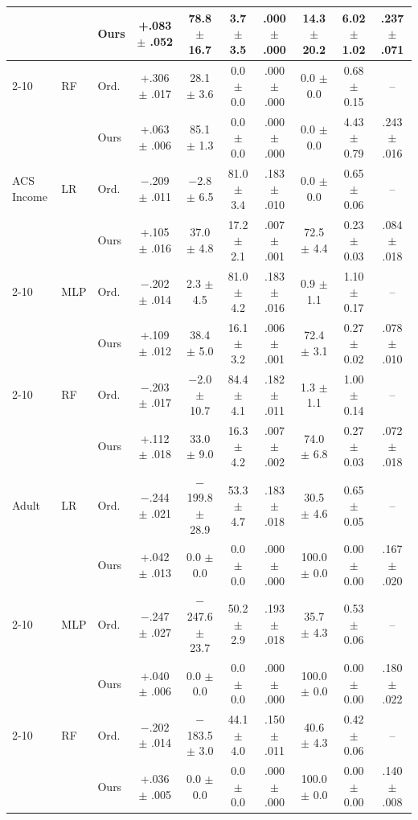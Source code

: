 \begin{table}[t]
\begin{tabular}{lll ccccccc}
 &  & Ours & +.083 $\pm$ .052 & 78.8 $\pm$ 16.7 & 3.7 $\pm$ 3.5 & .000 $\pm$ .000 & 14.3 $\pm$ 20.2 & 6.02 $\pm$ 1.02 & .237 $\pm$ .071 \\
\cline{2-10}
 & RF & Ord. & +.306 $\pm$ .017 & 28.1 $\pm$ 3.6 & 0.0 $\pm$ 0.0 & .000 $\pm$ .000 & 0.0 $\pm$ 0.0 & 0.68 $\pm$ 0.15 & -- \\
 &  & Ours & +.063 $\pm$ .006 & 85.1 $\pm$ 1.3 & 0.0 $\pm$ 0.0 & .000 $\pm$ .000 & 0.0 $\pm$ 0.0 & 4.43 $\pm$ 0.79 & .243 $\pm$ .016 \\
\hline
ACS Income & LR & Ord. & $-$.209 $\pm$ .011 & $-$2.8 $\pm$ 6.5 & 81.0 $\pm$ 3.4 & .183 $\pm$ .010 & 0.0 $\pm$ 0.0 & 0.65 $\pm$ 0.06 & -- \\
 &  & Ours & +.105 $\pm$ .016 & 37.0 $\pm$ 4.8 & 17.2 $\pm$ 2.1 & .007 $\pm$ .001 & 72.5 $\pm$ 4.4 & 0.23 $\pm$ 0.03 & .084 $\pm$ .018 \\
\cline{2-10}
 & MLP & Ord. & $-$.202 $\pm$ .014 & 2.3 $\pm$ 4.5 & 81.0 $\pm$ 4.2 & .183 $\pm$ .016 & 0.9 $\pm$ 1.1 & 1.10 $\pm$ 0.17 & -- \\
 &  & Ours & +.109 $\pm$ .012 & 38.4 $\pm$ 5.0 & 16.1 $\pm$ 3.2 & .006 $\pm$ .001 & 72.4 $\pm$ 3.1 & 0.27 $\pm$ 0.02 & .078 $\pm$ .010 \\
\cline{2-10}
 & RF & Ord. & $-$.203 $\pm$ .017 & $-$2.0 $\pm$ 10.7 & 84.4 $\pm$ 4.1 & .182 $\pm$ .011 & 1.3 $\pm$ 1.1 & 1.00 $\pm$ 0.14 & -- \\
 &  & Ours & +.112 $\pm$ .018 & 33.0 $\pm$ 9.0 & 16.3 $\pm$ 4.2 & .007 $\pm$ .002 & 74.0 $\pm$ 6.8 & 0.27 $\pm$ 0.03 & .072 $\pm$ .018 \\
\hline
Adult & LR & Ord. & $-$.244 $\pm$ .021 & $-$199.8 $\pm$ 28.9 & 53.3 $\pm$ 4.7 & .183 $\pm$ .018 & 30.5 $\pm$ 4.6 & 0.65 $\pm$ 0.05 & -- \\
 &  & Ours & +.042 $\pm$ .013 & 0.0 $\pm$ 0.0 & 0.0 $\pm$ 0.0 & .000 $\pm$ .000 & 100.0 $\pm$ 0.0 & 0.00 $\pm$ 0.00 & .167 $\pm$ .020 \\
\cline{2-10}
 & MLP & Ord. & $-$.247 $\pm$ .027 & $-$247.6 $\pm$ 23.7 & 50.2 $\pm$ 2.9 & .193 $\pm$ .018 & 35.7 $\pm$ 4.3 & 0.53 $\pm$ 0.06 & -- \\
 &  & Ours & +.040 $\pm$ .006 & 0.0 $\pm$ 0.0 & 0.0 $\pm$ 0.0 & .000 $\pm$ .000 & 100.0 $\pm$ 0.0 & 0.00 $\pm$ 0.00 & .180 $\pm$ .022 \\
\cline{2-10}
 & RF & Ord. & $-$.202 $\pm$ .014 & $-$183.5 $\pm$ 3.0 & 44.1 $\pm$ 4.0 & .150 $\pm$ .011 & 40.6 $\pm$ 4.3 & 0.42 $\pm$ 0.06 & -- \\
 &  & Ours & +.036 $\pm$ .005 & 0.0 $\pm$ 0.0 & 0.0 $\pm$ 0.0 & .000 $\pm$ .000 & 100.0 $\pm$ 0.0 & 0.00 $\pm$ 0.00 & .140 $\pm$ .008 \\
\hline
\end{tabular}
\end{table}

